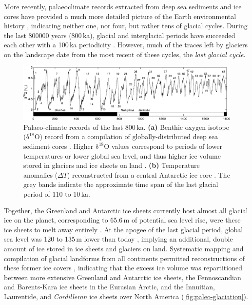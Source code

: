 \documentclass[a4paper]{kappa}
\newcommand{\chem}[1]{\ensuremath{\mathrm{#1}}}
\begin{document}
More recently, palaeoclimate records extracted from deep sea sediments and ice
cores have provided a much more detailed picture of the Earth environmental
history \citep[e.g.,][]{Emiliani.1955, Shackleton.Opdyke.1973,
Dansgaard.etal.1993, Augustin.etal.2004}, indicating neither one, nor four, but
rather tens of glacial cycles. During the last 800000 years (800\,ka), glacial
and interglacial periods have succeeded each other with a 100\,ka periodicity
\citep[\cref{fig:paleo-timeseries};]{Hays.etal.1976, Augustin.etal.2004}.
However, much of the traces left by glaciers on the landscape date from the
most recent of these cycles, the \emph{last glacial cycle}.

\begin{figure}
  \includegraphics{paleo-timeseries}
  \caption{Palaeo-climate records of the last 800\,ka.
           \textbf{(a)} Benthic oxygen isotope (\chem{\delta^{18}O}) record
           from a compilation of globally-distributed deep sea sediment cores
           \citep{Lisiecki.Raymo.2005}. Higher \chem{\delta^{18}O} values
           correspond to periods of lower temperatures \citep{Emiliani.1955}
           or lower global sea level, and thus higher ice volume stored in
           glaciers and ice sheets on land \citep{Shackleton.1967}.
           \textbf{(b)} Temperature anomalies ($\Delta T$) reconstructed from a
           central Antarctic ice core \citep[EPICA Dome~C,][]{Jouzel.etal.2007}.
           The grey bands indicate the approximate time span of the last
           glacial period of 110 to 10\,ka.}
  \label{fig:paleo-timeseries}
\end{figure}

Together, the Greenland and Antarctic ice sheets currently host almost all
glacial ice on the planet, corresponding to 65.6\,m of potential sea level
rise, were these ice sheets to melt away entirely \citep{Bamber.etal.2013,
Fretwell.etal.2013}. At the apogee of the last glacial period, global sea level
was 120 to 135\,m lower than today
\citep{Clark.Mix.2002}, implying an additional, double amount of ice stored in
ice sheets and glaciers on land. Systematic mapping and compilation of glacial
landforms from all continents \citep[e.g.,][]{Prest.etal.1968,
Boulton.Clark.1990, Kleman.etal.1997, Hattestrand.1998} permitted
reconstructions of these former ice covers \citep{Ehlers.Gibbard.2007},
indicating that the excess ice volume
was repartitioned between more extensive Greenland and Antarctic ice sheets,
the Fennoscandian and Barents-Kara ice sheets in the Eurasian Arctic, and the
Innuitian, Laurentide, and \emph{Cordilleran} ice
sheets over North America (\cref{fig:paleo-glaciation}).
\end{document}

